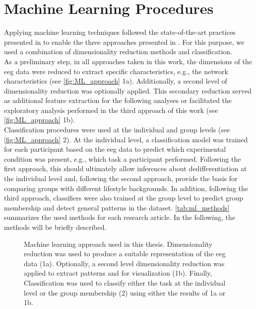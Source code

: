 \section{Machine Learning Procedures}
Applying machine learning techniques followed the state-of-the-art practices presented in  to enable the three approaches presented in . For this purpose, we used a combination of dimensionality reduction methods and classification.\\
As a preliminary step, in all approaches taken in this work, the dimensions of the \gls{eeg} data were reduced to extract specific characteristics, e.g., the network characteristics (see \autoref{fig:ML_approach} 1a). Additionally, a second level of dimensionality reduction was optionally applied. This secondary reduction served as additional feature extraction for the following analyses or facilitated the exploratory analysis performed in the third approach of this work (see \autoref{fig:ML_approach} 1b).\\
Classification procedures were used at the individual and group levels (see \autoref{fig:ML_approach} 2). At the individual level, a classification model was trained for each participant based on the \gls{eeg} data to predict which experimental condition was present, e.g., which task a participant performed. Following the first approach, this should ultimately allow inferences about dedifferentiation at the individual level and, following the second approach, provide the basis for comparing groups with different lifestyle backgrounds. In addition, following the third approach, classifiers were also trained at the group level to predict group membership and detect general patterns in the dataset. \autoref{tab:ml_methods}  summarizes the used methods for each research article. In the following, the methods will be briefly described.

\begin{figure}[ht]
\begin{center}

\captionsetup{justification=justified}
\caption[Machine learning approach used in this thesis]{Machine learning approach used in this thesis. Dimensionality reduction was used to produce a suitable representation of the \gls{eeg} data (1a). Optionally, a second level dimensionality reduction was applied to extract patterns and for visualization (1b). Finally, Classification was used to classify either the task at the individual level or the group membership (2) using either the results of 1a or 1b.}
\label{fig:ML_approach}
\end{center}
\end{figure}

